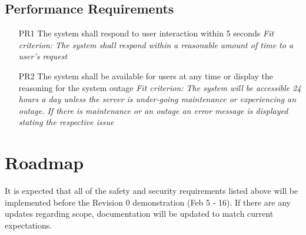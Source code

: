 \documentclass{article}
\begin{document}
\subsection{Performance Requirements}
\begin{enumerate}
    \item[PR1] The system shall respond to user interaction within 5 seconds\newline
    \textit{Fit criterion: The system shall respond within a reasonable amount of time to a user's request}
    \item[PR2] The system shall be available for users at any time or display the reasoning for the system outage \newline
    \textit{Fit criterion: The system will be accessible 24 hours a day unless the server is under-going maintenance or experiencing an outage. If there is maintenance or an outage an error message is displayed stating the respective issue}
\end{enumerate}


\section{Roadmap}

It is expected that all of the safety and security requirements listed above will be implemented before the Revision 0 demonstration (Feb 5 - 16). If there are any updates regarding scope, documentation will be updated to match current expectations.

\end{document}
